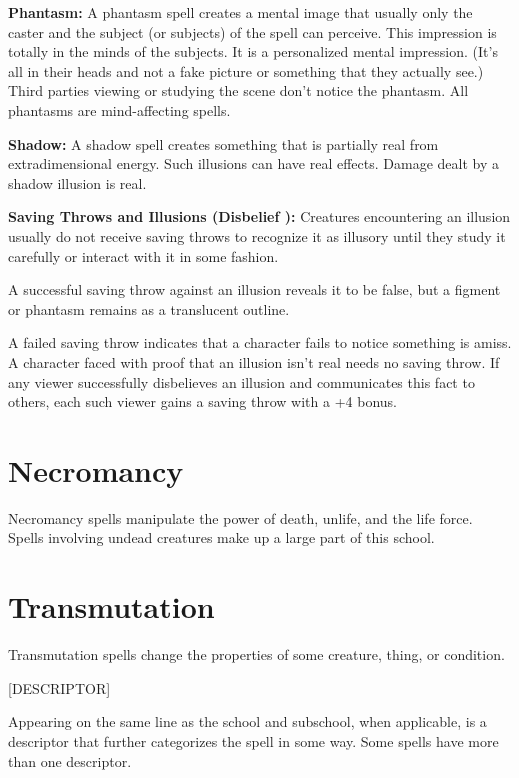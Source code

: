 \documentclass{article}
\begin{document}
\textbf{Phantasm: }A phantasm spell creates a mental image that usually only the 
caster and the subject (or subjects) of the spell can perceive. This impression 
is totally in the minds of the subjects. It is a personalized mental impression. 
(It's all in their heads and not a fake picture or something that they actually 
see.) Third parties viewing or studying the scene don't notice the phantasm. All 
phantasms are mind-affecting spells.

\textbf{Shadow:} A shadow spell creates something that is partially real from extradimensional 
energy. Such illusions can have real effects. Damage dealt by a shadow illusion 
is real.

\textbf{Saving Throws and Illusions (Disbelief ): }Creatures encountering an illusion 
usually do not receive saving throws to recognize it as illusory until they study 
it carefully or interact with it in some fashion.

A successful saving throw against an illusion reveals it to be false, but a figment 
or phantasm remains as a translucent outline.

A failed saving throw indicates that a character fails to notice something is amiss. 
A character faced with proof that an illusion isn't real needs no saving throw. 
If any viewer successfully disbelieves an illusion and communicates this fact to 
others, each such viewer gains a saving throw with a +4 bonus.

\vspace{12pt}
\section*{\textbf{Necromancy}}

Necromancy spells manipulate the power of death, unlife, and the life force. Spells 
involving undead creatures make up a large part of this school. 

\vspace{12pt}
\section*{\textbf{Transmutation}}

Transmutation spells change the properties of some creature, thing, or condition. 

\vspace{12pt}
[DESCRIPTOR]

Appearing on the same line as the school and subschool, when applicable, is a descriptor 
that further categorizes the spell in some way. Some spells have more than one 
descriptor.
\end{document}
